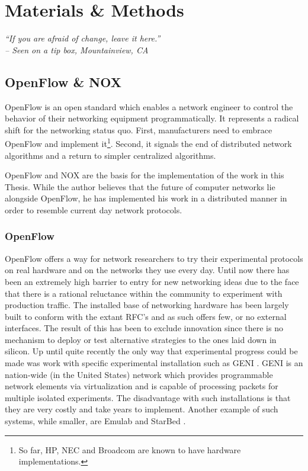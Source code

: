 \chapter{Materials \& Methods}
\label{chap:materials}

\begin{flushright}
 \textit{\textquotedblleft If you are afraid of change,
leave it here.\textquotedblright}\\
\textit{-- Seen on a tip box, Mountainview, CA}
\end{flushright}

\ifpdf
    \graphicspath{{6-MaterialMethods/Chapter6Figs/PDF/}}
\else
  \graphicspath{{6-MaterialMethods/Chapter6Figs/}}
\fi

\section{OpenFlow \& NOX}

OpenFlow is an open standard which enables a network engineer to control the behavior of their networking equipment programmatically. It represents a radical shift for the networking status quo. First,
manufacturers need to embrace OpenFlow and implement it\footnote{So far, HP,
NEC and Broadcom are known to have hardware implementations.}. Second, it
signals the end of distributed network algorithms and a return to simpler
centralized algorithms. 

OpenFlow and NOX are the basis for the implementation of the work in this Thesis. While the author believes that the future of computer networks lie alongside OpenFlow, he has implemented his work in a distributed manner in order to resemble current day network protocols.

\subsection{OpenFlow}
\label{sect:OPFW}

OpenFlow \cite{OPFW} offers a way for network researchers to try their
experimental protocols on real hardware and on the networks they use every day.
Until now there has been an extremely high barrier to entry for new networking
ideas due to the face that there is a rational reluctance within the community
to experiment with production traffic. The installed base of networking hardware has been largely built to conform with the extant RFC's and as such offers few, or no external interfaces. The result of this has been to exclude innovation since there is no mechanism to deploy or test alternative strategies to the ones laid down in silicon. Up until quite recently the only way that experimental progress could be made was work with specific experimental installation such as GENI \cite{GENI}. GENI is an nation-wide
(in the United States) network which provides programmable network elements via
virtualization and is capable of processing packets for multiple isolated
experiments. The disadvantage with such installations is that they are very
costly and take years to implement. Another example of such systems, while
smaller, are Emulab \cite{Emulab} and StarBed \cite{StarBed}.

